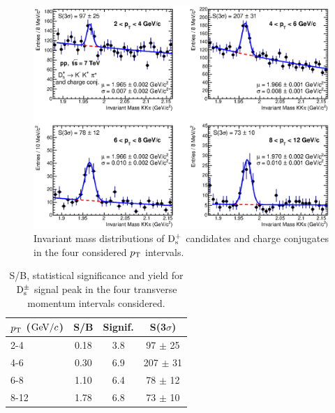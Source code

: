 \begin{figure}[!htb]
\begin{center}
 \includegraphics[width=.99\textwidth]{FigCap4/DsMassHistos_ppPass4.eps}
\caption{Invariant mass distributions of ${\rm D_s^+}$ candidates and charge
conjugates in the four considered $p_{\rm T}$ intervals.}             
\label{fig:invmassDs}
\end{center}
\end{figure}
\begin{table}[tbh!]
\centering
\begin{tabular}{|l|c|c|c|} 
\hline
 $p_{\rm T}$ ($\mathrm{GeV}/c$) & S/B  & Signif. & S(3$\sigma$)\\
\hline
2-4   & 0.18 & 3.8 & 97 $\pm$  25\\
4-6    & 0.30 & 6.9 & 207 $\pm$ 31\\
6-8    & 1.10 & 6.4 & 78 $\pm$ 12\\
8-12  & 1.78 & 6.8 & 73 $\pm$ 10\\
\hline
\end{tabular}
\caption{S/B, statistical significance and yield for ${\rm D_s^{\pm}}$ signal peak in the four transverse momentum intervals considered.} 
\label{tab:signalDs}
\end{table}


